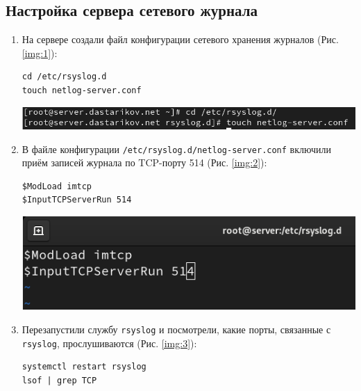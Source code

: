 \subsection{Настройка сервера сетевого журнала}
\begin{enumerate}

\item На сервере создали файл конфигурации сетевого хранения журналов (Рис. \ref{img:1}):
    \begin{verbatim}
cd /etc/rsyslog.d
touch netlog-server.conf
    \end{verbatim}

\begin{center}
    \centering
    \includegraphics[width=\textwidth]{../images/image01.png}
    \label{img:1}
\end{center}

\item В файле конфигурации {\tt /etc/rsyslog.d/netlog-server.conf} включили приём записей журнала по TCP-порту 514 (Рис. \ref{img:2}):
    \begin{verbatim}
$ModLoad imtcp
$InputTCPServerRun 514
    \end{verbatim}

\begin{center}
    \centering
    \includegraphics[width=\textwidth]{../images/image02.png}
    \label{img:2}
\end{center}

\item Перезапустили службу {\tt rsyslog} и посмотрели, какие порты, связанные с {\tt rsyslog}, прослушиваются (Рис. \ref{img:3}):
    \begin{verbatim}
systemctl restart rsyslog
lsof | grep TCP
    \end{verbatim}


\end{enumerate}
